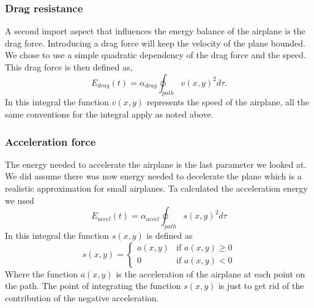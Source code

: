 \subsubsection{Drag resistance}

A second import aspect that influences the energy balance of the airplane is the drag force.
Introducing a drag force will keep the velocity of the plane bounded.
We chose to use a simple quadratic dependency of the drag force and the speed.
This drag force is then defined as,
\begin{equation}
E_{drag}(t)  =  \alpha_{drag} \oint_{path} v(x,y)^2  d \tau.
\end{equation}
In this integral the function $ v(x,y) $ represents the speed of the airplane, all the same conventions for the integral apply as noted above.


\subsubsection{Acceleration force}

The energy needed to accelerate the airplane is the last parameter we looked at.
We did assume there was now energy needed to decelerate the plane which is a realistic approximation for small airplanes.
Ta calculated the acceleration energy we used
\begin{equation}
E_{accel}(t)  =  \alpha_{accel} \oint_{path} s(x,y)^2  d \tau
\end{equation}
In this integral the function $ s(x,y) $ is defined as
\begin{equation}
s(x,y) = 
\begin{cases}
   a(x,y) & \text{if } a(x,y) \geq 0 \\
   0       & \text{if } a(x,y) < 0
  \end{cases}
\end{equation}
Where the function $ a(x,y) $ is the acceleration of the airplane at each point on the path.
The point of integrating the function $ s(x,y) $ is just to get rid of the contribution of the negative acceleration.





